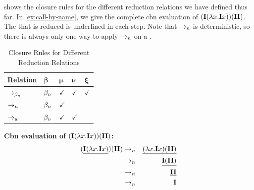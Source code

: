  shows the closure rules for the different reduction relations we have defined thus far.
In \cref{ex:call-by-name}, we give the complete \textsf{cbn} evaluation of \lterm $(\mathbf{I}(\lambda {x}.{\mathbf{I} x}))(\mathbf{I} \mathbf{I})$.
The \bre that is reduced is underlined in each step.
Note that $\to_n$ is deterministic, so there is always only one way to apply $\to_n$ on a \lterm.

\begin{table}[htbp]
\centering
\begin{tabularx}{\linewidth}{|X|XXXX|}
  \hline
  \textbf{Relation} & $\boldsymbol{\beta}$ & $\boldsymbol{\mu}$ & $\boldsymbol{\nu}$ & $\boldsymbol{\xi}$ \\
  \hline
  $\to_{\beta_n}$ & $\beta_n$ & $\checkmark$ & $\checkmark$ & $\checkmark$ \\
  \hline
  $\to_n$  & $\beta_n$ & $\checkmark$ &              &  \\
  \hline
  $\to_w$  & $\beta_n$ & $\checkmark$ & $\checkmark$ &  \\
  \hline
\end{tabularx}
\caption{Closure Rules for Different Reduction Relations}
\label{tab1:closure-rules}
\end{table}

\begin{example}
  \label{ex:call-by-name}
  \textbf{\textsf{Cbn} evaluation of $(\mathbf{I}(\lambda {x}.{\mathbf{I} x}))(\mathbf{I} \mathbf{I})$:}
  \begin{eqnarray*}
 (\underline{\mathbf{I}(\lambda {x}.{\mathbf{I} x})})(\mathbf{I} \mathbf{I}) &\to_n& \underline{(\lambda {x}.{\mathbf{I} x}) (\mathbf{I} \mathbf{I})} \\
    &\to_n& \underline{\mathbf{I} (\mathbf{I} \mathbf{I})} \\
    &\to_n& \underline{\mathbf{I} \mathbf{I}} \\
    &\to_n& \mathbf{I} 
  \end{eqnarray*}
\end{example}

